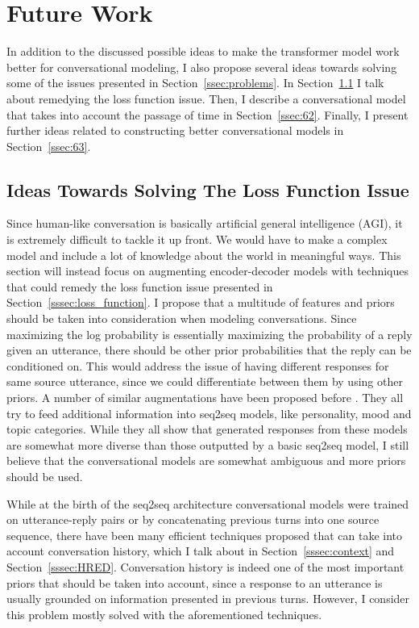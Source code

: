 \documentclass[12pt]{article}
\begin{document}
\newpage\section{Future Work} \label{sec:future}

In addition to the discussed possible ideas to make the transformer model work better for conversational modeling, I also propose several ideas towards solving some of the issues presented in Section~\ref{ssec:problems}. In Section~\ref{ssec:61} I talk about remedying the loss function issue. Then, I describe a conversational model that takes into account the passage of time in Section~\ref{ssec:62}. Finally, I present further ideas related to constructing better conversational models in Section~\ref{ssec:63}.
\subsection{Ideas Towards Solving The Loss Function Issue} \label{ssec:61}
Since human-like conversation is basically artificial general intelligence (AGI), it is extremely difficult to tackle it up front. We would have to make a complex model and include a lot of knowledge about the world in meaningful ways. This section will instead focus on augmenting encoder-decoder models with techniques that could remedy the loss function issue presented in Section~\ref{sssec:loss_function}. I propose that a multitude of features and priors should be taken into consideration when modeling conversations. Since maximizing the log probability is essentially maximizing the probability of a reply given an utterance, there should be other prior probabilities that the reply can be conditioned on. This would address the issue of having different responses for same source utterance, since we could differentiate between them by using other priors. A number of similar augmentations have been proposed before \cite{Li:2016,Xing_topic:2017,Zhou:2017,Choudhary:2017}. They all try to feed additional information into seq2seq models, like personality, mood and topic categories. While they all show that generated responses from these models are somewhat more diverse than those outputted by a basic seq2seq model, I still believe that the conversational models are somewhat ambiguous and more priors should be used.

While at the birth of the seq2seq architecture conversational models were trained on utterance-reply pairs or by concatenating previous turns into one source sequence, there have been many efficient techniques proposed that can take into account conversation history, which I talk about in Section~\ref{sssec:context} and Section~\ref{sssec:HRED}. Conversation history is indeed one of the most important priors that should be taken into account, since a response to an utterance is usually grounded on information presented in previous turns. However, I consider this problem mostly solved with the aforementioned techniques.
\end{document}
